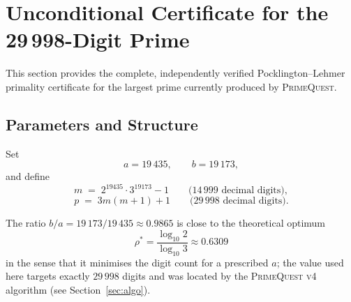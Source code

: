 %
%
%
%

\section{Unconditional Certificate for the 29\,998-Digit Prime}
\label{sec:cert29998}

This section provides the complete, independently verified Pocklington–Lehmer
primality certificate for the largest prime currently produced by
\textsc{PrimeQuest}.

\subsection{Parameters and Structure}

\begin{definition}\label{def:instance29998}
Set
\[
  a = 19\,435,\qquad b = 19\,173,
\]
and define
\[
  m \;=\; 2^{19435}\cdot 3^{19173} - 1
    \qquad\bigl(14\,999 \text{ decimal digits}\bigr),
\]
\[
  p \;=\; 3m(m+1)+1
    \qquad\bigl(29\,998 \text{ decimal digits}\bigr).
\]
\end{definition}

The ratio $b/a = 19\,173/19\,435 \approx 0.9865$ is close to the
theoretical optimum
\[
  \rho^* = \frac{\log_{10} 2}{\log_{10} 3} \approx 0.6309
\]
in the sense that it minimises the digit count for a prescribed $a$;
the value used here targets exactly $29\,998$ digits and was located by
the \textsc{PrimeQuest v4} algorithm (see Section~\ref{sec:algo}).

